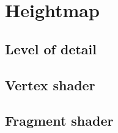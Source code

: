 \chapter{Heightmap}

\section{Level of detail}






\section{Vertex shader}



\section{Fragment shader}








